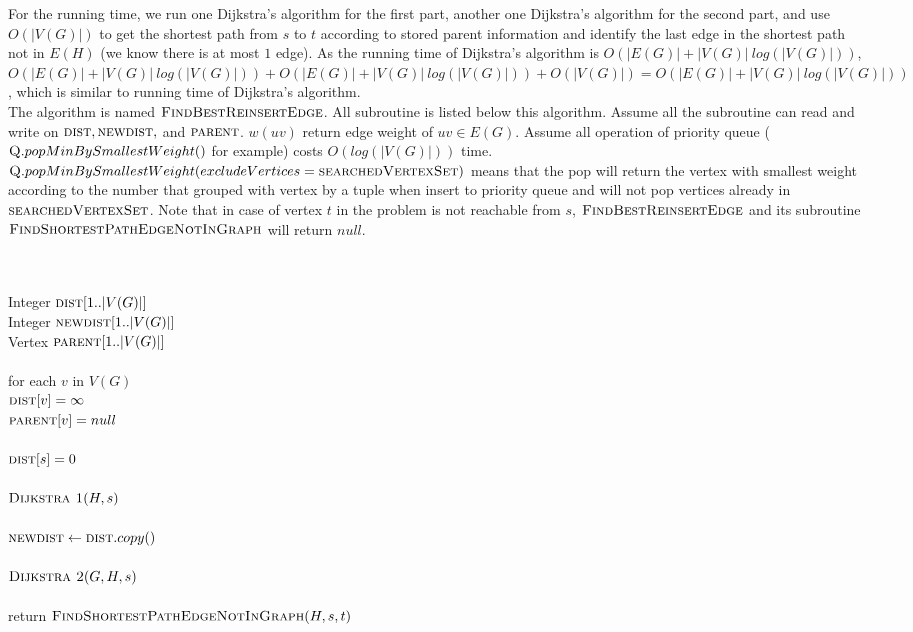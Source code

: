 \documentclass[11pt]{article}
\begin{document}
\begin{itemize}
	 For the running time, we run one Dijkstra's algorithm for the first part, another one Dijkstra's algorithm for the second part, and use $O(|V(G)|)$ to get the shortest path from $s$ to $t$ according to stored parent information and  identify the last edge in the shortest path not in $E(H)$ (we know there is at most $1$ edge). As the running time of Dijkstra's algorithm is $O(|E(G)| + |V(G)| \ log(|V(G)|))$, $O(|E(G)| + |V(G)| \ log(|V(G)|)) + O(|E(G)| + |V(G)| \ log(|V(G)|)) + O(|V(G)|) = O(|E(G)| + |V(G)| \ log(|V(G)|))$, which is similar to running time of Dijkstra's algorithm.\\
	 The algorithm is named $\textsc{FindBestReinsertEdge}$. All subroutine is listed below this algorithm. Assume all the subroutine can read and write on $\textsc{dist}, \textsc{newdist},$ and $\textsc{parent}$. $w(uv)$ return edge weight of $uv \in E(G)$. Assume all operation of priority queue ($\textsc{Q}.popMinBySmallestWeight()$ for example) costs $O(log(|V(G)|))$ time. $\textsc{Q}.popMinBySmallestWeight(excludeVertices=\textsc{searchedVertexSet})$ means that the pop will return the vertex with smallest weight according to the number that grouped with vertex by a tuple when insert to priority queue and will not pop vertices already in $\textsc{searchedVertexSet}$. Note that in case of vertex $t$ in the problem is not reachable from $s$, $\textsc{FindBestReinsertEdge}$ and its subroutine $\textsc{FindShortestPathEdgeNotInGraph}$ will return $null$.
	
	
	
	 	
\begin{algo}
	\+
\\[0.5ex]
\\		Integer $\textsc{dist}[1..|V(G)|]$
\\		Integer $\textsc{newdist}[1..|V(G)|]$
\\		Vertex $\textsc{parent}[1..|V(G)|]$
\\		
\\		for  each $v$ in $V(G)$\+
\\			$\textsc{dist}[v] = \infty$
\\			$\textsc{parent}[v] = null$\-
\\		
\\		$\textsc{dist}[s] = 0$
\\
\\		$\textsc{Dijkstra 1}(H, s)$
\\
\\		$\textsc{newdist} \gets \textsc{dist}.copy()$
\\
\\		$\textsc{Dijkstra 2}(G, H, s)$
\\
\\		return $\textsc{FindShortestPathEdgeNotInGraph}(H, s, t)$
\\[0.5ex]
\end{algo}


\end{itemize}
\end{document}
